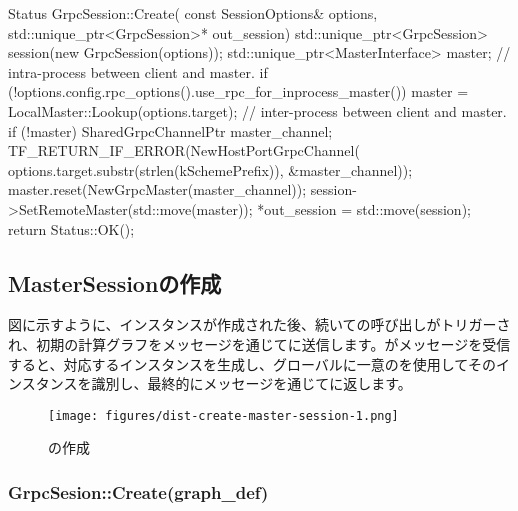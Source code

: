 \begin{content}
\begin{leftbar}
\begin{c++}
Status GrpcSession::Create(
    const SessionOptions& options,
    std::unique_ptr<GrpcSession>* out_session) {
  std::unique_ptr<GrpcSession> session(new GrpcSession(options));
  std::unique_ptr<MasterInterface> master;
  // intra-process between client and master.
  if (!options.config.rpc_options().use_rpc_for_inprocess_master()) {
    master = LocalMaster::Lookup(options.target);
  }
  // inter-process between client and master.
  if (!master) {
    SharedGrpcChannelPtr master_channel;
    TF_RETURN_IF_ERROR(NewHostPortGrpcChannel(
        options.target.substr(strlen(kSchemePrefix)), &master_channel));
    master.reset(NewGrpcMaster(master_channel));
  }
  session->SetRemoteMaster(std::move(master));
  *out_session = std::move(session);
  return Status::OK();
}
\end{c++}
\end{leftbar}

\subsection{MasterSessionの作成}

図に示すように、インスタンスが作成された後、続いての呼び出しがトリガーされ、初期の計算グラフをメッセージを通じてに送信します。がメッセージを受信すると、対応するインスタンスを生成し、グローバルに一意のを使用してそのインスタンスを識別し、最終的にメッセージを通じてに返します。

\begin{figure}[H]
\centering
\texttt{[image: figures/dist-create-master-session-1.png]}
\caption{の作成}
 \label{fig:dist-create-master-session-1}
\end{figure}


\subsubsection{GrpcSesion::Create(graph\_def)}


\end{content}
